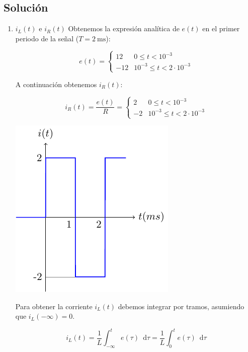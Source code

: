 \documentclass[10pt]{article}
\begin{document}
\subsection*{Solución}

\begin{enumerate}
\item $i_L(t)$ e $i_R(t)$
  Obtenemos la expresión analítica de $e(t)$ en el primer periodo de la señal ($T = \SI{2}{\milli\second}$):
  
  \[
    e(t) = %
    \begin{cases}
      12 & 0 \leq t < 10^{-3} \\
      -12 & 10^{-3} \leq t < 2 \cdot 10^{-3}
    \end{cases}
  \]

  A continuación obtenemos $i_R(t)$:

  \begin{minipage}[c]{0.5\linewidth}
    \[
      i_R(t) = \frac{e(t)}{R} = %
      \begin{cases}
        2 & 0 \leq t < 10^{-3} \\
        -2 & 10^{-3} \leq t < 2 \cdot 10^{-3}
      \end{cases}
    \]
  \end{minipage}
  \begin{minipage}[c]{0.5\linewidth}
    \includegraphics{figs/tren_pulsos2_solucion.pdf}
  \end{minipage}

  Para obtener la corriente $i_L(t)$ debemos integrar por tramos, asumiendo que $i_L(-\infty) = 0$.

  \[
    i_L(t) = \frac{1}{L} \int_{-\infty}^t e(\tau) \enspace \mathrm{d}\tau = \frac{1}{L} \int_0^t e(\tau) \enspace \mathrm{d}\tau
  \]


\end{enumerate}
\end{document}
